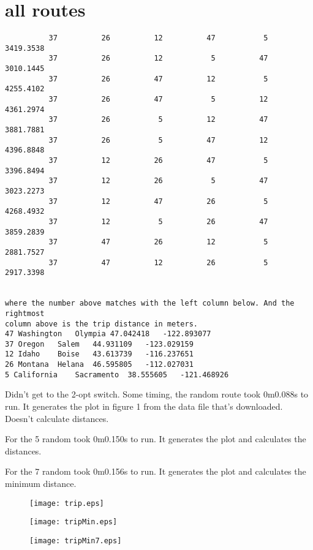 \documentclass{article}
\begin{document}
\section{all routes}
\begin{verbatim}
          37          26          12          47           5   3419.3538    
          37          26          12           5          47   3010.1445    
          37          26          47          12           5   4255.4102    
          37          26          47           5          12   4361.2974    
          37          26           5          12          47   3881.7881    
          37          26           5          47          12   4396.8848    
          37          12          26          47           5   3396.8494    
          37          12          26           5          47   3023.2273    
          37          12          47          26           5   4268.4932    
          37          12           5          26          47   3859.2839    
          37          47          26          12           5   2881.7527    
          37          47          12          26           5   2917.3398    


where the number above matches with the left column below. And the rightmost
column above is the trip distance in meters.
47 Washington	Olympia	47.042418	-122.893077
37 Oregon	Salem	44.931109	-123.029159
12 Idaho	Boise	43.613739	-116.237651
26 Montana	Helana	46.595805	-112.027031
5 California	Sacramento	38.555605	-121.468926
\end{verbatim}
Didn't get to the 2-opt switch.
Some timing, the random route took 0m0.088s to run. It generates the plot 
in figure 1 from the data file that's downloaded. Doesn't calculate distances.

For the 5 random took 0m0.150s to run. It generates the plot and calculates the
distances.

For the 7 random took 0m0.156s to run. It generates the plot and calculates the minimum distance. 


\begin{figure}[ht]
\texttt{[image: trip.eps]}
\caption{  }
\end{figure}

\begin{figure}
\texttt{[image: tripMin.eps]}
\caption{}
\end{figure}

\begin{figure}
\texttt{[image: tripMin7.eps]}
\caption{}
\end{figure}
\end{document}
